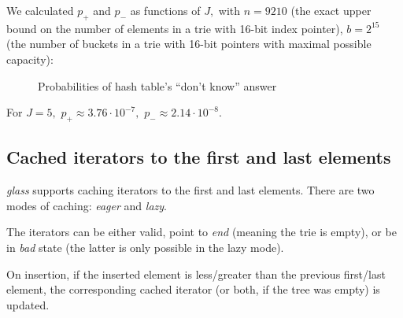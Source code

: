 \documentclass[a4paper,12pt]{article}
\begin{document}
We calculated $p_+$ and $p_-$ as functions of $J,$ with
$n = 9210$ (the exact upper bound on the number of elements in a trie with 16-bit index pointer),
$b = 2^{15}$ (the number of buckets in a trie with 16-bit pointers with maximal possible capacity):
\begin{figure}[H]
    \caption{Probabilities of hash table's ``don't know'' answer}
    \centering
\end{figure}

For $J=5,$ $p_+ \approx 3.76 \cdot 10^{-7},$ $p_- \approx 2.14 \cdot 10^{-8}.$

\subsection{Cached iterators to the first and last elements}

\textit{glass} supports caching iterators to the first and last elements.
There are two modes of caching: \textit{eager} and \textit{lazy}.

The iterators can be either valid, point to \textit{end} (meaning the trie is empty), or be in \textit{bad} state (the latter is only possible in the lazy mode).

On insertion, if the inserted element is less/greater than the previous first/last element, the corresponding cached iterator (or both, if the tree was empty) is updated.
\end{document}

